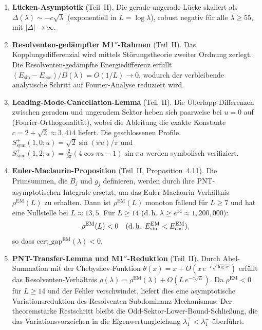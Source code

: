\documentclass[12pt,a4paper]{article}
\theoremstyle{definition}
\theoremstyle{remark}
\begin{document}
\begin{enumerate}[label=\textbf{N\arabic*},leftmargin=3em]
  \item \textbf{Lücken-Asymptotik} (Teil~II). Die gerade-ungerade Lücke skaliert als $\Delta(\lambda) \sim -c\sqrt{\lambda}$ (exponentiell in $L = \log\lambda$), robust negativ für alle $\lambda \geq 55$, mit $|\Delta| \to \infty$.

  \item \textbf{Resolventen-gedämpfter M1$''$-Rahmen} (Teil~II). Das Kopplungsdifferenzial wird mittels Störungstheorie zweiter Ordnung zerlegt. Die Resolventen-gedämpfte Energiedifferenz erfüllt $(E_{\sin} - E_{\cos})/D(\lambda) = O(1/L) \to 0$, wodurch der verbleibende analytische Schritt auf Fourier-Analyse reduziert wird.

  \item \textbf{Leading-Mode-Cancellation-Lemma} (Teil~II). Die Überlapp-Differenzen zwischen geradem und ungeradem Sektor heben sich paarweise bei $u = 0$ auf (Fourier-Orthogonalität), wobei die Ableitung die exakte Konstante $c = 2 + \sqrt{2} \approx 3{,}414$ liefert. Die geschlossenen Profile $S^+_{\mathrm{sym}}(1,0;u) = \sqrt{2}\sin(\pi u)/\pi$ und $S^+_{\mathrm{sym}}(1,2;u) = \tfrac{2}{3\pi}(4\cos\pi u - 1)\sin\pi u$ werden symbolisch verifiziert.

  \item \textbf{Euler-Maclaurin-Proposition} (Teil~II, Proposition~4.11). Die Primsummen, die $B_j$ und $g_j$ definieren, werden durch ihre PNT-asymptotischen Integrale ersetzt, um das Euler-Maclaurin-Verhältnis $\rho^{\mathrm{EM}}(L)$ zu erhalten. Dann ist $\rho^{\mathrm{EM}}(L)$ monoton fallend für $L \geq 7$ und hat eine Nullstelle bei $L \approx 13{,}5$. Für $L \geq 14$ (d.\,h. $\lambda \geq e^{14} \approx 1{,}200{,}000$):
  \[
    \rho^{\mathrm{EM}}(L) < 0 \quad\text{(d.\,h. } E_{\sin}^{\mathrm{EM}} < E_{\cos}^{\mathrm{EM}}\text{)},
  \]
  so dass $\mathrm{cert\_gap}^{\mathrm{EM}}(\lambda) < 0$.

  \item \textbf{PNT-Transfer-Lemma und M1$''$-Reduktion} (Teil~II). Durch Abel-Summation mit der Chebyshev-Funktion $\theta(x) = x + O(x\,e^{-c\sqrt{\log x}})$ erfüllt das Resolventen-Verhältnis $\rho(\lambda) = \rho^{\mathrm{EM}}(\lambda) + O(L\,e^{-c\sqrt{L}})$. Da $\rho^{\mathrm{EM}} < 0$ für $L \geq 14$ und der Fehler verschwindet, liefert dies eine asymptotische Variationsreduktion des Resolventen-Subdominanz-Mechanismus. Der theoremstarke Restschritt bleibt die Odd-Sektor-Lower-Bound-Schließung, die das Variationsvorzeichen in die Eigenwertungleichung $\lambda_1^+ < \lambda_1^-$ überführt.
\end{enumerate}
\end{document}
